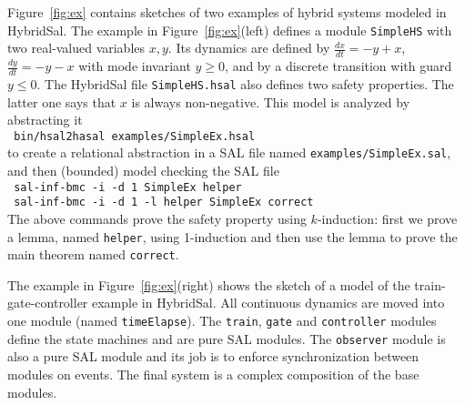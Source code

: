 \documentclass{llncs}
\begin{document}
Figure~\ref{fig:ex} contains sketches of two examples of 
hybrid systems modeled in HybridSal.
The example in Figure~\ref{fig:ex}(left) defines a module
{\tt{SimpleHS}} with two real-valued variables $x,y$.  Its 
dynamics are defined by %
$\frac{dx}{dt}=-y+x$, $\frac{dy}{dt}=-y-x$ with mode
invariant $y \geq 0$, and by a 
discrete transition with guard %
$y \leq 0$.
The HybridSal file {\tt{SimpleHS.hsal}} also defines 
two safety properties. The latter
one says that $x$ is always non-negative.
This model is analyzed by abstracting it 
\\ \indent
 {\tt{ bin/hsal2hasal examples/SimpleEx.hsal}}
\\ \noindent
to create a relational abstraction in 
a SAL file named {\tt{examples/SimpleEx.sal}},
and then (bounded) model checking the SAL file
\\ \indent
 {\tt{ sal-inf-bmc -i -d 1 SimpleEx helper}}
\\ \indent
 {\tt{ sal-inf-bmc -i -d 1 -l helper SimpleEx correct}}
\\ \noindent
The above commands prove the safety property using $k$-induction:
first we prove a lemma, named {\tt{helper}}, using 1-induction and then
use the lemma to prove the main theorem named {\tt{correct}}.

The example in Figure~\ref{fig:ex}(right) shows the sketch of
a model of the train-gate-controller example in HybridSal.
All continuous dynamics are moved into one module (named
{\tt{timeElapse}}).  The 
{\tt{train}},
{\tt{gate}} and
{\tt{controller}} modules define the state machines and are
pure SAL modules.
The {\tt{observer}} module is also a pure SAL module
and its job is to enforce synchronization between
modules on events.
The final system is a complex composition of the base modules.
\end{document}
